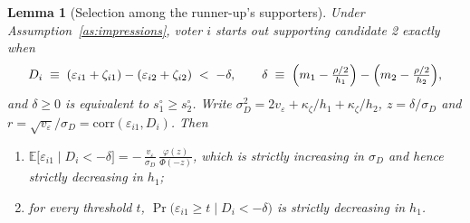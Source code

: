 \documentclass[11pt]{article}
\newtheorem{lemma}{Lemma}
\theoremstyle{definition}
\theoremstyle{remark}
\begin{document}
\begin{lemma}[Selection among the runner-up's supporters]
\label{lem:selection}
Under Assumption~\ref{as:impressions}, voter $i$ starts out supporting
candidate 2 exactly when
\[
  D_i \;\equiv\; (\varepsilon_{i1} + \zeta_{i1})
    - (\varepsilon_{i2} + \zeta_{i2}) \;<\; -\delta,
  \qquad
  \delta \;\equiv\; \Bigl(m_1 - \tfrac{\rho/2}{h_1}\Bigr)
    - \Bigl(m_2 - \tfrac{\rho/2}{h_2}\Bigr),
\]
and $\delta \ge 0$ is equivalent to $s^\circ_1 \ge s^\circ_2$. Write
$\sigma_D^2 = 2v_\varepsilon + \kappa_\zeta/h_1 + \kappa_\zeta/h_2$,
$z = \delta/\sigma_D$ and
$r = \sqrt{v_\varepsilon}/\sigma_D = \mathrm{corr}(\varepsilon_{i1}, D_i)$.
Then
\begin{enumerate}
\item[(a)] $\displaystyle
      \mathbb{E}\bigl[\varepsilon_{i1} \mid D_i < -\delta\bigr]
      = -\,\frac{v_\varepsilon}{\sigma_D}\,\frac{\varphi(z)}{\Phi(-z)}$,
      which is strictly increasing in $\sigma_D$ and hence strictly
      \emph{decreasing} in $h_1$;
\item[(b)] for every threshold $t$,
      $\Pr\bigl(\varepsilon_{i1} \ge t \mid D_i < -\delta\bigr)$ is strictly
      decreasing in $h_1$.
\end{enumerate}
\end{lemma}
\end{document}
